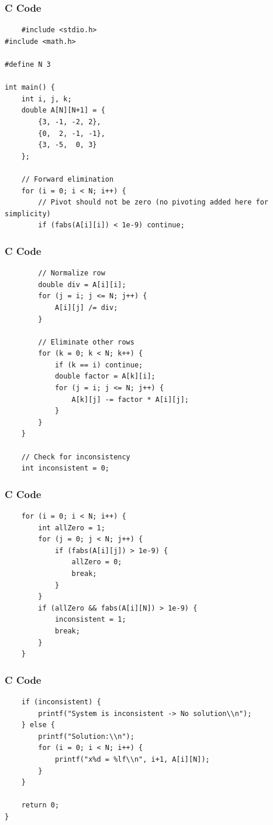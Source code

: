 \documentclass{beamer}
\begin{document}
\begin{frame}[fragile]
\frametitle{C Code}
\begin{lstlisting}
    #include <stdio.h>
#include <math.h>

#define N 3

int main() {
    int i, j, k;
    double A[N][N+1] = {
        {3, -1, -2, 2},
        {0,  2, -1, -1},
        {3, -5,  0, 3}
    };

    // Forward elimination
    for (i = 0; i < N; i++) {
        // Pivot should not be zero (no pivoting added here for simplicity)
        if (fabs(A[i][i]) < 1e-9) continue;
\end{lstlisting}
\end{frame}
\begin{frame}[fragile]
\frametitle{C Code}
\begin{lstlisting}
        // Normalize row
        double div = A[i][i];
        for (j = i; j <= N; j++) {
            A[i][j] /= div;
        }

        // Eliminate other rows
        for (k = 0; k < N; k++) {
            if (k == i) continue;
            double factor = A[k][i];
            for (j = i; j <= N; j++) {
                A[k][j] -= factor * A[i][j];
            }
        }
    }

    // Check for inconsistency
    int inconsistent = 0;
    \end{lstlisting}
\end{frame}
\begin{frame}[fragile]
\frametitle{C Code}
\begin{lstlisting}
    for (i = 0; i < N; i++) {
        int allZero = 1;
        for (j = 0; j < N; j++) {
            if (fabs(A[i][j]) > 1e-9) {
                allZero = 0;
                break;
            }
        }
        if (allZero && fabs(A[i][N]) > 1e-9) {
            inconsistent = 1;
            break;
        }
    }
\end{lstlisting}
\end{frame}
\begin{frame}[fragile]
\frametitle{C Code}
\begin{lstlisting}
    if (inconsistent) {
        printf("System is inconsistent -> No solution\\n");
    } else {
        printf("Solution:\\n");
        for (i = 0; i < N; i++) {
            printf("x%d = %lf\\n", i+1, A[i][N]);
        }
    }

    return 0;
}
\end{lstlisting}
\end{frame}
\end{document}

